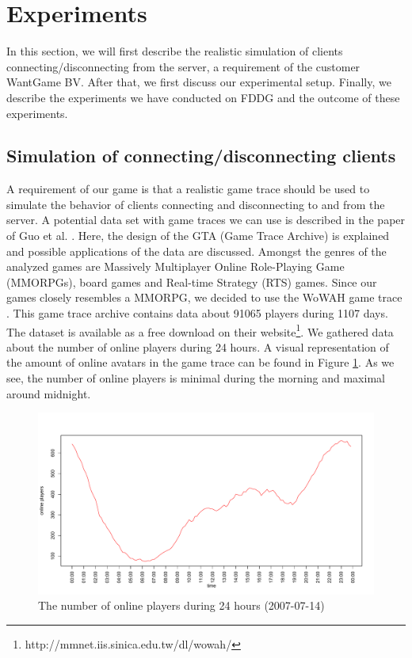 \section{Experiments}
	In this section, we will first describe the realistic simulation of clients connecting/disconnecting from the server, a requirement of the customer WantGame BV. After that, we first discuss our experimental setup. Finally, we describe the experiments we have conducted on FDDG and the outcome of these experiments.
	
\subsection{Simulation of connecting/disconnecting clients}
\label{subsec:simulation_clients}
A requirement of our game is that a realistic game trace should be used to simulate the behavior of clients connecting and disconnecting to and from the server.
A potential data set with game traces we can use is described in the paper of Guo et al. \cite{guo2012game}.
Here, the design of the GTA (Game Trace Archive) is explained and possible applications of the data are discussed.
Amongst the genres of the analyzed games are Massively Multiplayer Online Role-Playing Game (MMORPGs), board games and Real-time Strategy (RTS) games. 
Since our games closely resembles a MMORPG, we decided to use the WoWAH game trace \cite{lee2011world}.
This game trace archive contains data about 91065 players during 1107 days. The dataset is available as a free download on their website\footnote{http://mmnet.iis.sinica.edu.tw/dl/wowah/}.
We gathered data about the number of online players during 24 hours. 
A visual representation of the amount of online avatars in the game trace can be found in Figure \ref{fig:online_players_plot}. As we see, the number of online players is minimal during the morning and maximal around midnight.

\begin{figure}[h!]
  \centering
    \includegraphics[width=\textwidth]{images/online_players_plot}
    
  \caption{The number of online players during 24 hours (2007-07-14)}
  \label{fig:online_players_plot}
\end{figure}

